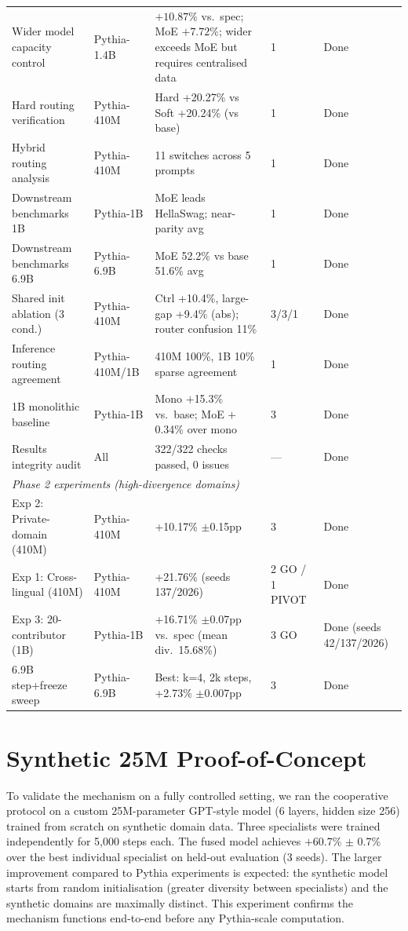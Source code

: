 \documentclass{article}
\begin{document}
\begin{table}[h]
{\begin{tabular}{p{5.0cm}p{2.8cm}p{5.5cm}p{1.8cm}p{3.5cm}}
Wider model capacity control & Pythia-1.4B & $+10.87\%$ vs.\ spec; MoE $+7.72\%$; wider exceeds MoE but requires centralised data & 1 & Done \\
Hard routing verification & Pythia-410M & Hard +20.27\% vs Soft +20.24\% (vs base) & 1 & Done \\
Hybrid routing analysis & Pythia-410M & 11 switches across 5 prompts & 1 & Done \\
Downstream benchmarks 1B & Pythia-1B & MoE leads HellaSwag; near-parity avg & 1 & Done \\
Downstream benchmarks 6.9B & Pythia-6.9B & MoE 52.2\% vs base 51.6\% avg & 1 & Done \\
Shared init ablation (3 cond.) & Pythia-410M & Ctrl +10.4\%, large-gap +9.4\% (abs); router confusion 11\% & 3/3/1 & Done \\
Inference routing agreement & Pythia-410M/1B & 410M 100\%, 1B 10\% sparse agreement & 1 & Done \\
1B monolithic baseline & Pythia-1B & Mono $+$15.3\% vs.\ base; MoE $+$0.34\% over mono & 3 & Done \\
Results integrity audit & All & 322/322 checks passed, 0 issues & --- & Done \\
\midrule
\multicolumn{5}{l}{\textit{Phase 2 experiments (high-divergence domains)}} \\
\midrule
Exp 2: Private-domain (410M) & Pythia-410M & +10.17\% $\pm$0.15pp & 3 & Done \\
Exp 1: Cross-lingual (410M) & Pythia-410M & +21.76\% (seeds 137/2026) & 2 GO / 1 PIVOT & Done \\
Exp 3: 20-contributor (1B) & Pythia-1B & +16.71\% $\pm$0.07pp vs.\ spec (mean div.\ 15.68\%) & 3 GO & Done (seeds 42/137/2026) \\
6.9B step+freeze sweep & Pythia-6.9B & Best: k=4, 2k steps, +2.73\% $\pm$0.007pp & 3 & Done \\
\bottomrule
\end{tabular}%
}
\end{table}

\section{Synthetic 25M Proof-of-Concept}
\label{app:synthetic}

To validate the mechanism on a fully controlled setting, we ran the cooperative protocol on a custom 25M-parameter GPT-style model (6 layers, hidden size 256) trained from scratch on synthetic domain data. Three specialists were trained independently for 5,000 steps each. The fused model achieves $+$60.7\% $\pm$ 0.7\% over the best individual specialist on held-out evaluation (3 seeds). The larger improvement compared to Pythia experiments is expected: the synthetic model starts from random initialisation (greater diversity between specialists) and the synthetic domains are maximally distinct. This experiment confirms the mechanism functions end-to-end before any Pythia-scale computation.
\end{document}
